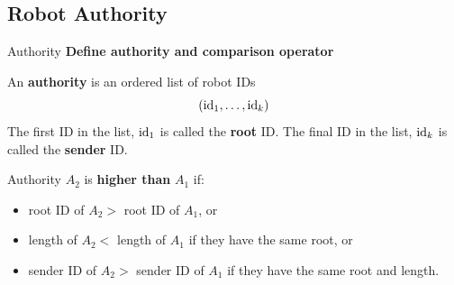 \subsection{Robot Authority}
\begin{frame}{Authority}
  \textbf{Define authority and comparison operator}
      \begin{definition}
      \small{An \textbf{authority} is an ordered list of robot IDs
        $$({\rm id}_1, \ldots, {\rm id}_k)$$
        The first ID in the list, ${\rm id}_1$ is called the \textbf{root} ID.
        The final ID in the list, ${\rm id}_k$ is called the \textbf{sender} ID.}
    \end{definition}
    \begin{definition}
      \small{Authority $A_2$ is \textbf{higher than} $A_1$ if:}
      \begin{itemize}
      \item \small{root ID of $A_2 >$ root ID of $A_1$, or}
      \item \small{length of $A_2 <$  length of $A_1$ if they have the same root, or}
      \item \small{sender ID of $A_2 >$ sender ID of $A_1$ if they have the same root and length.}
      \end{itemize}
    \end{definition}
\end{frame}


